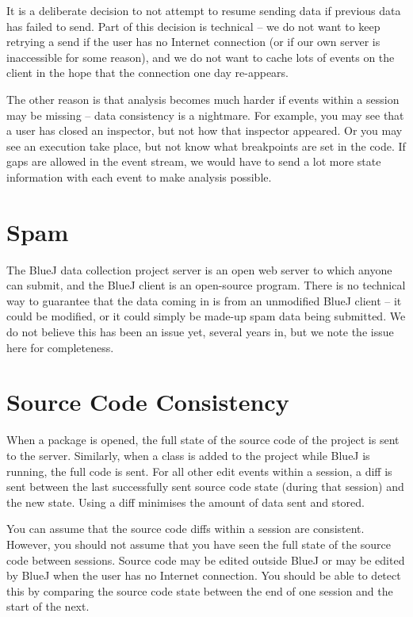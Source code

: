 \documentclass{report}
\begin{document}
It is a deliberate decision to not attempt to resume sending data if previous
data has failed to send.  Part of this decision is technical -- we do not want
to keep retrying a send if the user has no Internet connection (or if our own
server is inaccessible for some reason), and we do not want to cache lots of
events on the client in the hope that the connection one day re-appears.

The other reason is that analysis becomes much harder if events within a session
may be missing -- data consistency is a nightmare.  For example, you may see
that a user has closed an inspector, but not how that inspector appeared.  Or
you may see an execution take place, but not know what breakpoints are set in
the code.  If gaps are allowed in the event stream, we would have to send a
lot more state information with each event to make analysis possible.

\section{Spam}
\label{def:spam}

The BlueJ data collection project server is an open web server to which anyone
can submit, and the BlueJ client is an open-source program.  There is no
technical way to guarantee that the data coming in is from an unmodified BlueJ
client -- it could be modified, or it could simply be made-up spam data being
submitted.  We do not believe this has been an issue yet, several years in, but
we note the issue here for completeness.

\section{Source Code Consistency}

When a package is opened, the full state of the source code of the project is
sent to the server.  Similarly, when a class is added to the project while
BlueJ is running, the full code is sent.  For all other edit events within a session, a diff is sent
between the last successfully sent source code state (during that session) and
the new state.  Using a diff minimises the amount of data sent and stored.

You can assume that the source code diffs within a session are consistent.
However, you should not assume that you have seen the full state of the source
code between sessions.  Source code may be edited outside BlueJ or may be edited
by BlueJ when the user has no Internet connection.  You should be able to
detect this by comparing the source code state between the end of one session
and the start of the next.
\end{document}
